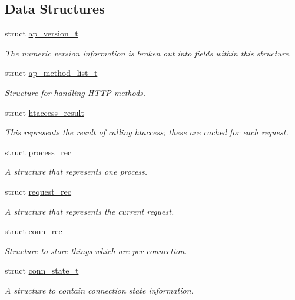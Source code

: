 \subsection*{Data Structures}
\begin{DoxyCompactItemize}
\item 
struct \hyperlink{structap__version__t}{ap\+\_\+version\+\_\+t}
\begin{DoxyCompactList}\small\item\em The numeric version information is broken out into fields within this structure. \end{DoxyCompactList}\item 
struct \hyperlink{structap__method__list__t}{ap\+\_\+method\+\_\+list\+\_\+t}
\begin{DoxyCompactList}\small\item\em Structure for handling H\+T\+TP methods. \end{DoxyCompactList}\item 
struct \hyperlink{structhtaccess__result}{htaccess\+\_\+result}
\begin{DoxyCompactList}\small\item\em This represents the result of calling htaccess; these are cached for each request. \end{DoxyCompactList}\item 
struct \hyperlink{structprocess__rec}{process\+\_\+rec}
\begin{DoxyCompactList}\small\item\em A structure that represents one process. \end{DoxyCompactList}\item 
struct \hyperlink{structrequest__rec}{request\+\_\+rec}
\begin{DoxyCompactList}\small\item\em A structure that represents the current request. \end{DoxyCompactList}\item 
struct \hyperlink{structconn__rec}{conn\+\_\+rec}
\begin{DoxyCompactList}\small\item\em Structure to store things which are per connection. \end{DoxyCompactList}\item 
struct \hyperlink{structconn__state__t}{conn\+\_\+state\+\_\+t}
\begin{DoxyCompactList}\small\item\em A structure to contain connection state information. \end{DoxyCompactList}\item 

\end{DoxyCompactItemize}
